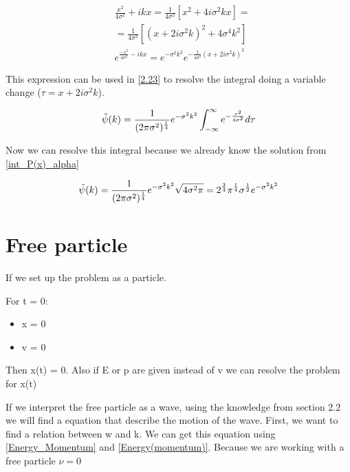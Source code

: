 \begin{equation}
    \label{eq_2.24} 
    \begin{split}
    & \frac{x^2}{4\sigma^2}+ikx = \frac{1}{4\sigma^2}[x^2+4i\sigma^2 k x] = 
    \\
    & = \frac{1}{4\sigma^2}[(x+2i\sigma^2k)^2+4\sigma^4k^2]
    \\
    & e^{\frac{-x^2}{4\sigma^2}-ikx} = e^{-\sigma^2k^2}e^{-\frac{1}{4\sigma^2}(x+2i\sigma^2k)^2}
    \end{split}
\end{equation}

This expression can be used in \ref{2.23} to resolve the integral doing a variable change ($\tau = x+2i\sigma^2k$).

\begin{equation}
    \label{2.23}
    \Tilde{\psi}(k) = \frac{1}{(2\pi\sigma^2)^{\frac{1}{4}} } e^{-\sigma^2k^2} \int_{-\infty}^{\infty} e^{-\frac{\tau^2}{4\sigma^2}} d\tau
\end{equation}


Now we can resolve this integral because we already know the solution from \ref{int_P(x)_alpha}

\begin{equation}
    \label{2.23}
    \Tilde{\psi}(k) = \frac{1}{(2\pi\sigma^2)^{\frac{1}{4}} } e^{-\sigma^2k^2} \sqrt{4\sigma^2\pi} = 2^{\frac{3}{4}}\pi^{\frac{1}{4}}\sigma^{\frac{1}{2}} e^{-\sigma^2k^2}
\end{equation}

\section{Free particle}

If we set up the problem as a particle.

For t = 0:
    \begin{itemize}
        \item x = 0
        \item v = 0
    \end{itemize}

Then x(t) = 0. Also if E or p are given instead of v we can resolve the problem for x(t) 

If we interpret the free particle as a wave, using the knowledge from section 2.2 we will find a equation that describe the motion of the wave. First, we want to find a relation between w and k. We can get this equation using \ref{Energy_Momentum} and \ref{Energy(momentum)}. Because we are working with a free particle $\nu = 0$


